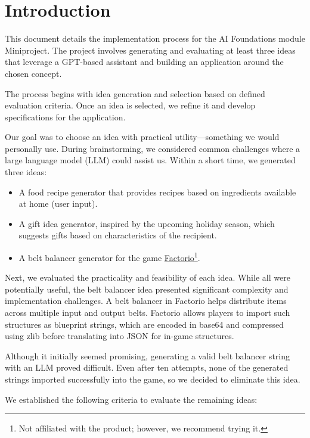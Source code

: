 \chapter{Introduction}
\label{chapter:introduction}

This document details the implementation process for the AI Foundations module Miniproject. The project involves generating and evaluating at least three ideas that leverage a GPT-based assistant and building an application around the chosen concept.

The process begins with idea generation and selection based on defined evaluation criteria. Once an idea is selected, we refine it and develop specifications for the application.

Our goal was to choose an idea with practical utility—something we would personally use. During brainstorming, we considered common challenges where a large language model (LLM) could assist us. Within a short time, we generated three ideas:

\begin{itemize}
	\item A food recipe generator that provides recipes based on ingredients available at home (user input).
	\item A gift idea generator, inspired by the upcoming holiday season, which suggests gifts based on characteristics of the recipient.
	\item A belt balancer generator for the game \href{https://www.factorio.com}{Factorio}\footnote{Not affiliated with the product; however, we recommend trying it.}.
\end{itemize}

Next, we evaluated the practicality and feasibility of each idea. While all were potentially useful, the belt balancer idea presented significant complexity and implementation challenges. A belt balancer in Factorio helps distribute items across multiple input and output belts. Factorio allows players to import such structures as blueprint strings, which are encoded in base64 and compressed using zlib before translating into JSON for in-game structures.

Although it initially seemed promising, generating a valid belt balancer string with an LLM proved difficult. Even after ten attempts, none of the generated strings imported successfully into the game, so we decided to eliminate this idea.

We established the following criteria to evaluate the remaining ideas:

